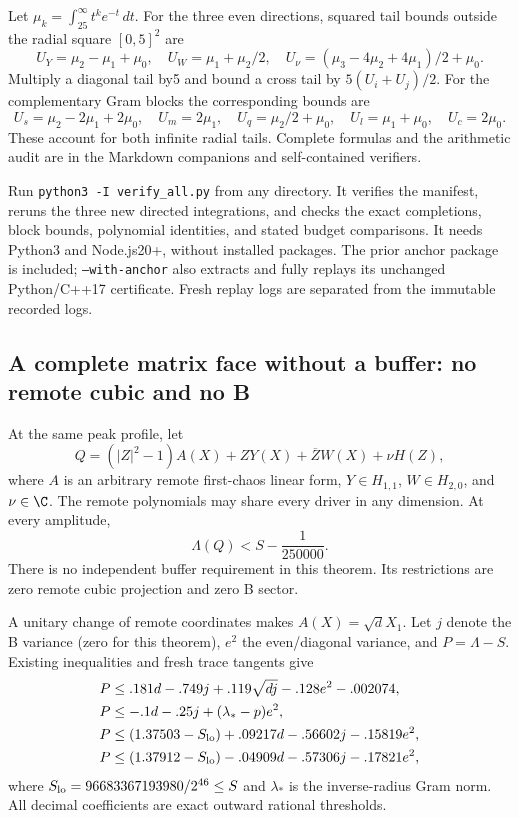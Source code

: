 Let $\mu_k=\int_{25}^\infty t^ke^{-t}\,dt$. For the three even directions, squared tail bounds outside the radial square $[0,5]^2$ are
\[
 U_Y=\mu_2-\mu_1+\mu_0,\quad U_W=\mu_1+\mu_2/2,\quad
 U_\nu=(\mu_3-4\mu_2+4\mu_1)/2+\mu_0.
\]
Multiply a diagonal tail by5 and bound a cross tail by $5(U_i+U_j)/2$. For the complementary Gram blocks the corresponding bounds are
\[
 U_s=\mu_2-2\mu_1+2\mu_0,\quad U_m=2\mu_1,\quad
 U_q=\mu_2/2+\mu_0,\quad U_l=\mu_1+\mu_0,\quad U_c=2\mu_0.
\]
These account for both infinite radial tails. Complete formulas and the arithmetic audit are in the Markdown companions and self-contained verifiers.

Run \texttt{python3 -I verify\_all.py} from any directory. It verifies the manifest, reruns the three new directed integrations, and checks the exact completions, block bounds, polynomial identities, and stated budget comparisons. It needs Python3 and Node.js20+, without installed packages. The prior anchor package is included; \texttt{--with-anchor} also extracts and fully replays its unchanged Python/C++17 certificate. Fresh replay logs are separated from the immutable recorded logs.

\subsection{A complete matrix face without a buffer: no remote cubic and no B}
\label{sec:ch42-no-B-face}
\begin{theorem}
At the same peak profile, let
\[
 Q=(|Z|^2-1)A(X)+ZY(X)+\overline ZW(X)+\nu H(Z),
\]
where $A$ is an arbitrary remote first-chaos linear form, $Y\in H_{1,1}$, $W\in H_{2,0}$, and $\nu\in\C$. The remote polynomials may share every driver in any dimension. At every amplitude,
\[
 \Lambda(Q)<S-\frac1{250000}.
\]
There is no independent buffer requirement in this theorem. Its restrictions are zero remote cubic projection and zero B sector.
\end{theorem}

A unitary change of remote coordinates makes $A(X)=\sqrt dX_1$. Let $j$ denote the B variance (zero for this theorem), $e^2$ the even/diagonal variance, and $P=\Lambda-S$. Existing inequalities and fresh trace tangents give
\begin{align*}
 P&\le .181d-.749j+.119\sqrt{dj}-.128e^2-.002074,\\
 P&\le-.1d-.25j+(\lambda_*-p)e^2,\\
 P&\le(1.37503-S_{\rm lo})+.09217d-.56602j-.15819e^2,\\
 P&\le(1.37912-S_{\rm lo})-.04909d-.57306j-.17821e^2,
\end{align*}
where $S_{\rm lo}=96683367193980/2^{46}\le S$ and $\lambda_*$ is the inverse-radius Gram norm. All decimal coefficients are exact outward rational thresholds.

